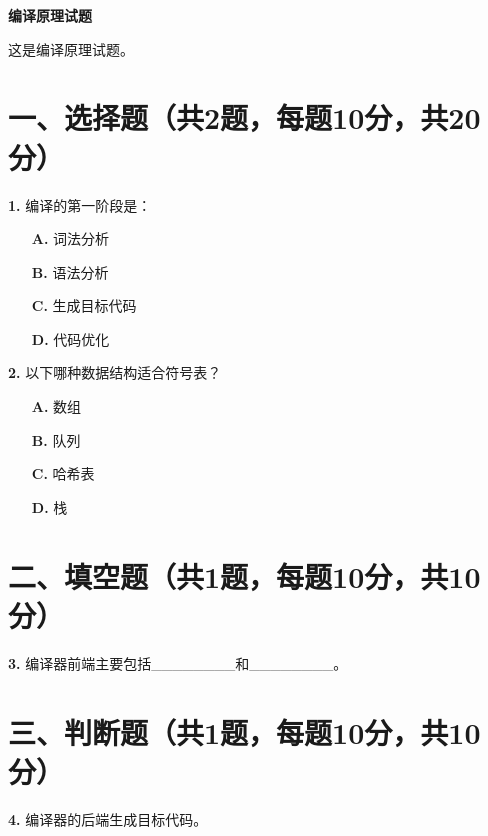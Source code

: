\documentclass[12pt]{article}
\begin{document}
\begin{center}
\LARGE\textbf{编译原理试题}
\end{center}
\vspace{0.5cm}
这是编译原理试题。
\vspace{0.5cm}
\section*{一、选择题（共2题，每题10分，共20分）}
\noindent\textbf{1.} 编译的第一阶段是：\\[0.2em]
\begin{itemize}[label=~]
\item[\textbf{A.}] 词法分析
\item[\textbf{B.}] 语法分析
\item[\textbf{C.}] 生成目标代码
\item[\textbf{D.}] 代码优化
\end{itemize}
\vspace{0.5cm}
\noindent\textbf{2.} 以下哪种数据结构适合符号表？\\[0.2em]
\begin{itemize}[label=~]
\item[\textbf{A.}] 数组
\item[\textbf{B.}] 队列
\item[\textbf{C.}] 哈希表
\item[\textbf{D.}] 栈
\end{itemize}
\vspace{0.5cm}
\section*{二、填空题（共1题，每题10分，共10分）}
\noindent\textbf{3.} 编译器前端主要包括\_\_\_\_\_\_\_\_和\_\_\_\_\_\_\_\_。\\[0.2em]
\vspace{0.5cm}
\section*{三、判断题（共1题，每题10分，共10分）}
\noindent\textbf{4.} 编译器的后端生成目标代码。\\[0.2em]
\vspace{0.5cm}
\end{document}
